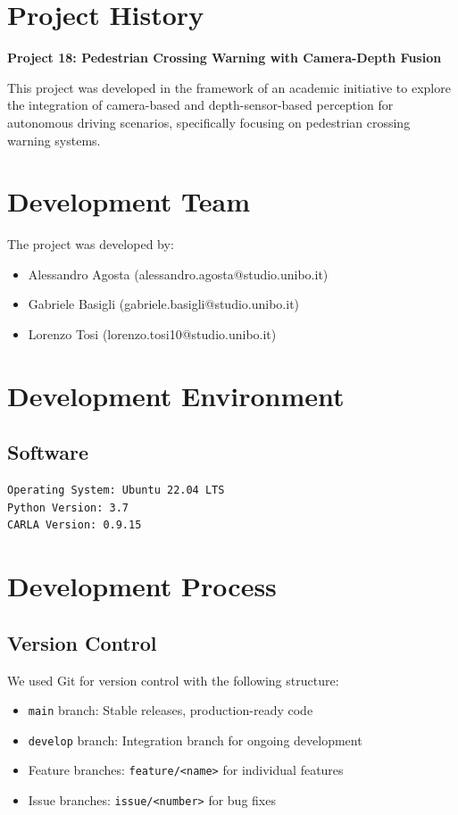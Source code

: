 \section{Project History}

\textbf{Project 18: Pedestrian Crossing Warning with Camera-Depth Fusion}

This project was developed in the framework of an academic initiative to explore the integration of camera-based and depth-sensor-based perception for autonomous driving scenarios, specifically focusing on pedestrian crossing warning systems.

\section{Development Team}

The project was developed by:
\begin{itemize}
    \item Alessandro Agosta (alessandro.agosta@studio.unibo.it)
    \item Gabriele Basigli (gabriele.basigli@studio.unibo.it)
    \item Lorenzo Tosi (lorenzo.tosi10@studio.unibo.it)
\end{itemize}

\section{Development Environment}
\subsection{Software}

\begin{verbatim}
Operating System: Ubuntu 22.04 LTS
Python Version: 3.7
CARLA Version: 0.9.15
\end{verbatim}

\section{Development Process}

\subsection{Version Control}

We used Git for version control with the following structure:
\begin{itemize}
    \item \texttt{main} branch: Stable releases, production-ready code
    \item \texttt{develop} branch: Integration branch for ongoing development
    \item Feature branches: \verb|feature/<name>| for individual features
    \item Issue branches: \verb|issue/<number>| for bug fixes
\end{itemize}

